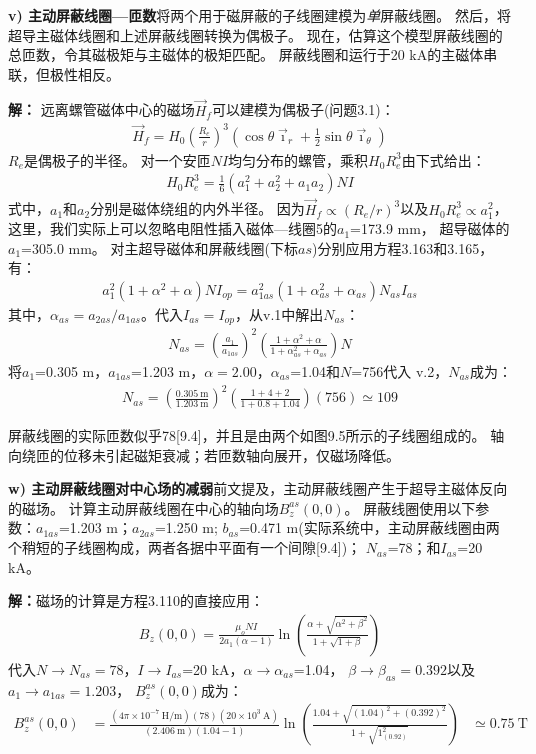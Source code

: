 \textbf{v) 主动屏蔽线圈---匝数}\qquad 将两个用于磁屏蔽的子线圈建模为\textit{单}屏蔽线圈。
然后，将超导主磁体线圈和上述屏蔽线圈转换为偶极子。
现在，估算这个模型屏蔽线圈的总匝数，令其磁极矩与主磁体的极矩匹配。
屏蔽线圈和运行于20 kA的主磁体串联，但极性相反。

\textbf{解：} 远离螺管磁体中心的磁场$\vec{H}_f$可以建模为偶极子(问题3.1)：
\begin{align*}%
\vec{H}_f=H_0(\frac{R_e}{r})^3(\cos\theta{\vec{\imath}_r}+\frac{1}{2}\sin\theta\vec{\imath}_\theta) \tag{3.163}
\end{align*}
$R_e$是偶极子的半径。
对一个安匝$NI$均匀分布的螺管，乘积$H_0 R_e^3$由下式给出：
\begin{align*}%
H_0R_e^3=\frac{1}{6}(a_1^2+a_2^2+a_1a_2)NI \tag{3.165}
\end{align*}
式中，$a_1$和$a_2$分别是磁体绕组的内外半径。
因为$\vec{H}_f\propto (R_e/r)^3$以及$H_0 R_e^3\propto a_1^2$，
这里，我们实际上可以忽略电阻性插入磁体---线圈5的$a_1$=173.9 mm，
超导磁体的$a_1$=305.0 mm。
对主超导磁体和屏蔽线圈(下标$as$)分别应用方程3.163和3.165，有：
\begin{align*}%
a_1^2(1+\alpha^2+\alpha)NI_{op}=a_{1as}^2(1+\alpha_{as}^2+\alpha_{as})N_{as}I_{as} \tag{v.1}
\end{align*}
其中，$\alpha_{as}=a_{2as}/a_{1as}$。代入$I_{as}=I_{op}$，从v.1中解出$N_{as}$：
\begin{align*}%
N_{as}=(\frac{a_1}{a_{1as}})^2(\frac{1+\alpha^2+\alpha}{1+\alpha_{as}^2+\alpha_{as}})N \tag{v.2}
\end{align*}
将$a_1$=0.305 m，$a_{1as}$=1.203 m，$\alpha=2.00$，$\alpha_{as}$=1.04和$N$=756代入
v.2，$N_{as}$成为：
\begin{align*}%
N_{as}=(\frac{0.305\ \mathrm{m}}{1.203\ \mathrm{m}})^2(\frac{1+4+2}{1+0.8+1.04})(756)\simeq 109
\end{align*}

屏蔽线圈的实际匝数似乎78[9.4]，并且是由两个如图9.5所示的子线圈组成的。
轴向绕匝的位移未引起磁矩衰减；若匝数轴向展开，仅磁场降低。

\textbf{w) 主动屏蔽线圈对中心场的减弱}\qquad 前文提及，主动屏蔽线圈产生于超导主磁体反向的磁场。
计算主动屏蔽线圈在中心的轴向场$B_z^{as}(0,0)$。
屏蔽线圈使用以下参数：$a_{1as}$=1.203 m；$a_{2as}$=1.250 m;
$b_{as}$=0.471 m(实际系统中，主动屏蔽线圈由两个稍短的子线圈构成，两者各据中平面有一个间隙[9.4])；
$N_{as}$=78；和$I_{as}$=20 kA。

\textbf{解：}磁场的计算是方程3.110的直接应用：
\begin{align*}%
B_z(0,0)=\frac{\mu_oNI}{2a_1(\alpha-1)}\ln(\frac{\alpha+\sqrt{\alpha^2+\beta^2}}{1+\sqrt{1+\beta}}) \tag{3.110}
\end{align*}
代入$N\rightarrow N_{as}=78$，$I\rightarrow I_{as}$=20 kA，$\alpha\rightarrow \alpha_{as}$=1.04，
$\beta\rightarrow \beta_{as}=0.392$以及$a_1\rightarrow a_{1as}=1.203$，
$B_z^{as}(0,0)$成为：
\begin{align*}%
B_z^{as}(0,0)&=\frac{(4\pi\times 10^{-7}\ \mathrm{H/m})(78)(20\times 10^3\ \mathrm{A})}{(2.406\ \mathrm{m})(1.04-1)}\ln(\frac{1.04+\sqrt{(1.04)^2+(0.392)^2}}{1+\sqrt{1_(0.92)^2}})
&\simeq 0.75\ \mathrm{T}
\end{align*}

